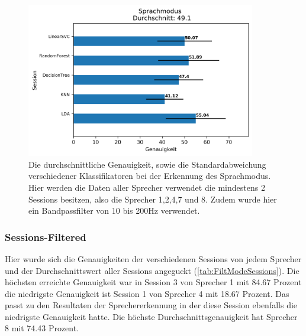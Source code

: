 \begin{figure}[H]
  \centering
  \includegraphics[width=100mm ,scale=0.6]{modeResultsSession10too200hz .png}
  \caption{Die durchschnittliche Genauigkeit, sowie die Standardabweichung verschiedener Klassifikatoren bei der Erkennung des Sprachmodus. Hier werden die Daten aller Sprecher verwendet die mindestens 2 Sessions besitzen, also die Sprecher 1,2,4,7 und 8. Zudem wurde hier ein Bandpassfilter von 10 bis 200Hz verwendet.}
  \label{fig:mode2}
\end{figure}

\clearpage

\subsubsection{Sessions-Filtered}
Hier wurde sich die Genauigkeiten der verschiedenen Sessions von jedem Sprecher und der Durchschnittswert aller Sessions angeguckt (\ref{tab:FiltModeSessions}). Die höchsten erreichte Genauigkeit war in Session 3 von Sprecher 1 mit 84.67 Prozent die niedrigste Genauigkeit ist Session 1 von Sprecher 4 mit 18.67 Prozent. Das passt zu den Resultaten der Sprechererkennung in der diese Session ebenfalls die niedrigste Genauigkeit hatte.
Die höchste Durchschnittsgenauigkeit hat Sprecher 8 mit 74.43 Prozent.

